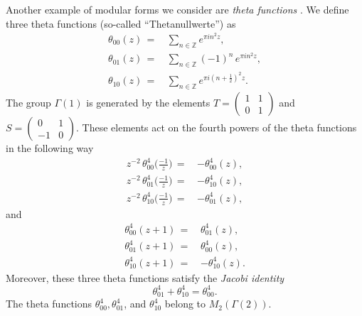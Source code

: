 \documentclass{scrartcl}
\newcommand{\Z}{\mathbb{Z}}
\begin{document}
Another example of modular forms we consider are \emph{theta functions} \cite[Section~3.1]{1-2-3}.
We define three theta functions (so-called ``Thetanullwerte'') as
\begin{align*}
  \theta_{00}(z)\,=\, & \sum_{n\in\Z}e^{\pi i n^2 z}, \\
  \theta_{01}(z)\,=\, & \sum_{n\in\Z}(-1)^n\,e^{\pi i n^2 z}, \\
  \theta_{10}(z)\,=\, & \sum_{n\in\Z}e^{\pi i (n+\frac12)^2 z}.
\end{align*}
The group $\Gamma(1)$ is generated by the elements $T=\left(\begin{smallmatrix}1&1\\0&1\end{smallmatrix}\right)$ and $S=\left(\begin{smallmatrix}0&1\\-1&0\end{smallmatrix}\right)$. These elements  act on the fourth powers of the theta functions in the following way
\begin{align}
z^{-2}\,\theta^4_{00}\Big(\frac{-1}{z}\Big)\,=\,&-\theta_{00}^4(z), \label{eqn: theta transform S}\\
z^{-2}\,\theta^4_{01}\Big(\frac{-1}{z}\Big)\,=\,&-\theta_{10}^4(z),\\
z^{-2}\,\theta^4_{10}\Big(\frac{-1}{z}\Big)\,=\,&-\theta_{01}^4(z),
\end{align}
and
\begin{align}
\theta^4_{00}(z+1)\,=\,&\theta_{01}^4(z),\\
\theta^4_{01}(z+1)\,=\,&\theta_{00}^4(z),\\
\theta^4_{10}(z+1)\,=\,&-\theta_{10}^4(z). \label{eqn: theta transform T}
\end{align}
Moreover, these three theta functions satisfy the \emph{Jacobi identity}
\begin{equation}
\theta_{01}^4+\theta_{10}^4=\theta_{00}^4.
\end{equation}
The theta functions $\theta^4_{00},\theta^4_{01}$, and $\theta^4_{10}$ belong to $M_2(\Gamma(2))$.
\end{document}
